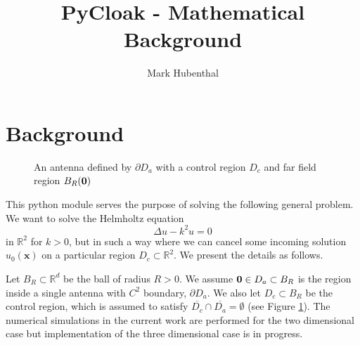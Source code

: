 \documentclass[11pt]{amsart}
\title{PyCloak - Mathematical Background}
\date{}
\author[Mark Hubenthal]{Mark Hubenthal}
\theoremstyle{definition}
\theoremstyle{definition}
\theoremstyle{definition}
\def\B0{{\bf 0}}
\begin{document}
\maketitle

\section{Background}
\label{sec:background}
\begin{figure}
\centering
\def \svgwidth{0.4\linewidth}

\caption{An antenna defined by $\partial D_{a}$ with a control region $D_{c}$ and far field region $B_R(\B0)$ }\label{fig:mainsetup}
\end{figure}
This python module serves the purpose of solving the following general problem. We want to solve the Helmholtz equation
\begin{equation*}
\Delta u - k^{2} u = 0
\end{equation*}
in $\mathbb{R}^{2}$ for $k > 0$, but in such a way where we can cancel some incoming solution $u_{0}(\mathbf{x})$ on a particular region $D_{c} \subset \mathbb{R}^{2}$. We present the details as follows.

Let $B_{R} \subset \mathbb{R}^{d}$ be the ball of radius $R > 0$. We assume $\B0\in D_{a} \subset  B_{R}$ is the region inside a single antenna with $C^{2}$ boundary, $\partial D_{a}$. We also let $D_{c} \subset B_{R}$ be the control region, which is assumed to satisfy $\overline{D_{c}} \cap \overline{D_{a}} = \emptyset$ (see Figure \ref{fig:mainsetup}). The numerical simulations in the current work are performed for the two dimensional case but implementation of the three dimensional case is in progress.
\end{document}
